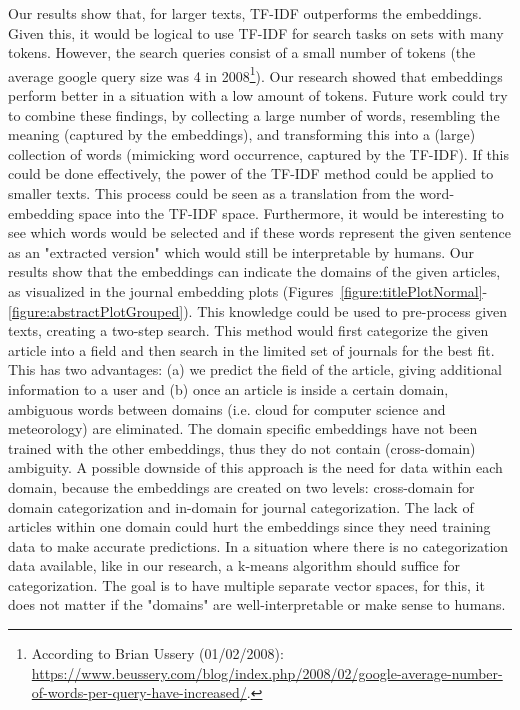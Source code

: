 \documentclass[../../Thesis.tex]{subfiles}
\begin{document}
Our results show that, for larger texts, TF-IDF outperforms the embeddings. Given this, it would be logical to use TF-IDF for search tasks on sets with many tokens. However, the search queries consist of a small number of tokens (the average google query size was 4 in 2008\footnote{According to Brian Ussery (01/02/2008): \url{https://www.beussery.com/blog/index.php/2008/02/google-average-number-of-words-per-query-have-increased/}.}). Our research showed that embeddings perform better in a situation with a low amount of tokens. Future work could try to combine these findings, by collecting a large number of words, resembling the meaning (captured by the embeddings), and transforming this into a (large) collection of words (mimicking word occurrence, captured by the TF-IDF). If this could be done effectively, the power of the TF-IDF method could be applied to smaller texts. This process could be seen as a translation from the word-embedding space into the TF-IDF space. Furthermore, it would be interesting to see which words would be selected and if these words represent the given sentence as an "extracted version" which would still be interpretable by humans.
\clearpage
{}
Our results show that the embeddings can indicate the domains of the given articles, as visualized in the journal embedding plots (Figures~\ref{figure:titlePlotNormal}-\ref{figure:abstractPlotGrouped}). This knowledge could be used to pre-process given texts, creating a two-step search. This method would first categorize the given article into a field and then search in the limited set of journals for the best fit. This has two advantages: (a) we predict the field of the article, giving additional information to a user and (b) once an article is inside a certain domain, ambiguous words between domains (i.e. cloud for computer science and meteorology) are eliminated. The domain specific embeddings have not been trained with the other embeddings, thus they do not contain (cross-domain) ambiguity. A possible downside of this approach is the need for data within each domain, because the embeddings are created on two levels: cross-domain for domain categorization and in-domain for journal categorization. The lack of articles within one domain could hurt the embeddings since they need training data to make accurate predictions. In a situation where there is no categorization data available, like in our research, a k-means algorithm should suffice for categorization. The goal is to have multiple separate vector spaces, for this, it does not matter if the "domains" are well-interpretable or make sense to humans.
\end{document}

